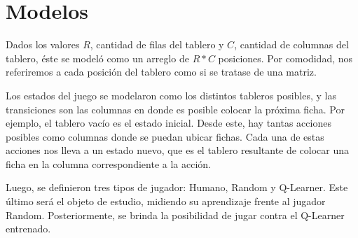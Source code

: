 \section{Modelos}
Dados los valores $R$, cantidad de filas del tablero y $C$, cantidad de columnas del tablero, \'este se model\'o como un arreglo de $R * C$ posiciones. Por comodidad, nos referiremos a cada posici\'on del tablero como si se tratase de una matriz.

Los estados del juego se modelaron como los distintos tableros posibles, y las transiciones son las columnas en donde es posible colocar la pr\'oxima ficha. Por ejemplo, el tablero vacío es el estado inicial. Desde este, hay tantas acciones posibles como columnas donde se puedan ubicar fichas. Cada una de estas acciones nos lleva a un estado nuevo, que es el tablero resultante de colocar una ficha en la columna correspondiente a la acción.

Luego, se definieron tres tipos de jugador: Humano, Random y Q-Learner. Este \'ultimo ser\'a el objeto de estudio, midiendo su aprendizaje frente al jugador Random. 
Posteriormente, se brinda la posibilidad de jugar contra el Q-Learner entrenado.
